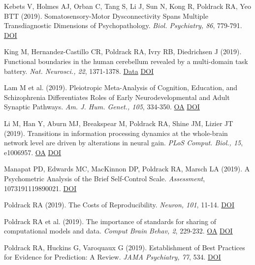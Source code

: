Kebets V, Holmes AJ, Orban C, Tang S, Li J, Sun N, Kong R, Poldrack RA, Yeo BTT (2019). Somatosensory-Motor Dysconnectivity Spans Multiple Transdiagnostic Dimensions of Psychopathology. \textit{Biol. Psychiatry, 86}, 779-791. \href{http://dx.doi.org/10.1016/j.biopsych.2019.06.013}{DOI} \vspace{2mm}

King M, Hernandez-Castillo CR, Poldrack RA, Ivry RB, Diedrichsen J (2019). Functional boundaries in the human cerebellum revealed by a multi-domain task battery. \textit{Nat. Neurosci., 22}, 1371-1378. \href{https://openneuro.org/datasets/ds002105/versions/1.1.0}{Data} \href{http://dx.doi.org/10.1038/s41593-019-0436-x}{DOI} \vspace{2mm}

Lam M et al. (2019). Pleiotropic Meta-Analysis of Cognition, Education, and Schizophrenia Differentiates Roles of Early Neurodevelopmental and Adult Synaptic Pathways. \textit{Am. J. Hum. Genet., 105}, 334-350. \href{https://www.ncbi.nlm.nih.gov/pmc/articles/PMC6699140}{OA} \href{http://dx.doi.org/10.1016/j.ajhg.2019.06.012}{DOI} \vspace{2mm}

Li M, Han Y, Aburn MJ, Breakspear M, Poldrack RA, Shine JM, Lizier JT (2019). Transitions in information processing dynamics at the whole-brain network level are driven by alterations in neural gain. \textit{PLoS Comput. Biol., 15}, e1006957. \href{https://www.ncbi.nlm.nih.gov/pmc/articles/PMC6793849}{OA} \href{http://dx.doi.org/10.1371/journal.pcbi.1006957}{DOI} \vspace{2mm}

Manapat PD, Edwards MC, MacKinnon DP, Poldrack RA, Marsch LA (2019). A Psychometric Analysis of the Brief Self-Control Scale. \textit{Assessment}, 1073191119890021. \href{http://dx.doi.org/10.1177/1073191119890021}{DOI} \vspace{2mm}

Poldrack RA (2019). The Costs of Reproducibility. \textit{Neuron, 101}, 11-14. \href{http://dx.doi.org/10.1016/j.neuron.2018.11.030}{DOI} \vspace{2mm}

Poldrack RA et al. (2019). The importance of standards for sharing of computational models and data. \textit{Comput Brain Behav, 2}, 229-232. \href{https://www.ncbi.nlm.nih.gov/pmc/articles/PMC7241435}{OA} \href{http://dx.doi.org/10.1007/s42113-019-00062-x}{DOI} \vspace{2mm}

Poldrack RA, Huckins G, Varoquaux G (2019). Establishment of Best Practices for Evidence for Prediction: A Review. \textit{JAMA Psychiatry, 77}, 534. \href{http://dx.doi.org/10.1001/jamapsychiatry.2019.3671}{DOI} \vspace{2mm}

